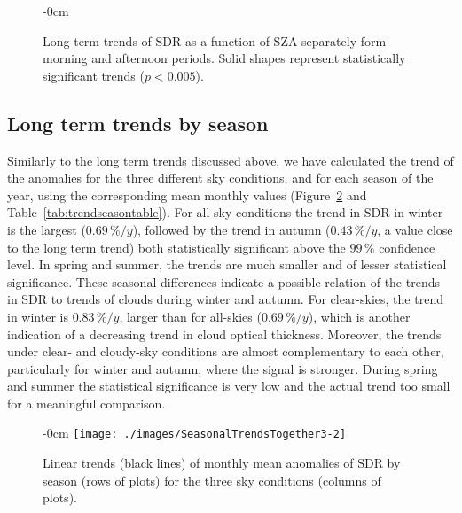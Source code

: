 \documentclass[applsci,article,submit,moreauthors,pdftex]{Definitions/mdpi}
\begin{document}
\begin{figure}[h!]
    \begin{adjustwidth}{-\extralength}{0cm}
        {\centering 
            \hfill
            \hfill
        }
        \caption{Long term trends of SDR as a function of SZA separately form morning and afternoon periods. Solid shapes  represent statistically significant trends ($p < 0.005$).}\label{fig:szatrends}
    \end{adjustwidth}
\end{figure}

\hypertarget{long-term-trends-by-season}{%
\subsection{Long term trends by
season}\label{long-term-trends-by-season}}

Similarly to the long term trends discussed above, we have calculated
the trend of the anomalies for the three different sky conditions, and
for each season of the year, using the corresponding mean monthly values
(Figure~\ref{fig:seasonalALL} and Table~\ref{tab:trendseasontable}). For
all-sky conditions the trend in SDR in winter is the largest
(\(0.69\,\%/y\)), followed by the trend in autumn (\(0.43\,\%/y\), a
value close to the long term trend) both statistically significant above
the \(99\,\%\) confidence level. In spring and summer, the trends are
much smaller and of lesser statistical significance. These seasonal
differences indicate a possible relation of the trends in SDR to trends
of clouds during winter and autumn. For clear-skies, the trend in winter
is \(0.83\,\%/y\), larger than for all-skies (\(0.69\,\%/y\)), which is
another indication of a decreasing trend in cloud optical thickness.
Moreover, the trends under clear- and cloudy-sky conditions are almost
complementary to each other, particularly for winter and autumn, where
the signal is stronger. During spring and summer the statistical
significance is very low and the actual trend too small for a meaningful
comparison.

\begin{figure}[h!]
    \begin{adjustwidth}{-\extralength}{0cm}
        {\centering 
            \texttt{[image: ./images/SeasonalTrendsTogether3-2]} 
        }
        \caption{Linear trends (black lines) of monthly mean anomalies of SDR by season (rows of plots) for the three sky conditions (columns of plots).}\label{fig:seasonalALL}
    \end{adjustwidth}
\end{figure}
\end{document}
